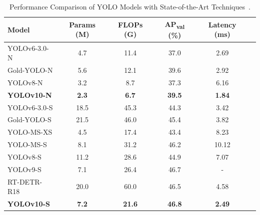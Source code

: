 \documentclass[12pt,oneside]{book} %
\begin{document}
\begin{table}[H]
    \centering
    \caption{Performance Comparison of YOLO Models with State-of-the-Art Techniques~\cite{wang2024yolov10}.}
    \begin{adjustbox}{max width=0.75\textwidth}
        \begin{tabular}{lccccc}
            \toprule
            \textbf{Model}     & \textbf{Params (M)} & \textbf{FLOPs (G)} & \textbf{AP\textsubscript{val} (\%)} & \textbf{Latency (ms)} \\
            \midrule
            YOLOv6-3.0-N       & 4.7                 & 11.4               & 37.0                                & 2.69                  \\
            Gold-YOLO-N        & 5.6                 & 12.1               & 39.6                                & 2.92                  \\
            YOLOv8-N           & 3.2                 & 8.7                & 37.3                                & 6.16                  \\
            \textbf{YOLOv10-N} & \textbf{2.3}        & \textbf{6.7}       & \textbf{39.5}                       & \textbf{1.84}         \\  
            \midrule
            YOLOv6-3.0-S       & 18.5                & 45.3               & 44.3                                & 3.42                  \\  
            Gold-YOLO-S        & 21.5                & 46.0               & 45.4                                & 3.82                  \\  
            YOLO-MS-XS         & 4.5                 & 17.4               & 43.4                                & 8.23                  \\  
            YOLO-MS-S          & 8.1                 & 31.2               & 46.2                                & 10.12                 \\  
            YOLOv8-S           & 11.2                & 28.6               & 44.9                                & 7.07                  \\  
            YOLOv9-S           & 7.1                 & 26.4               & 46.7                                & -                     \\  
            RT-DETR-R18        & 20.0                & 60.0               & 46.5                                & 4.58                  \\  
            \textbf{YOLOv10-S} & \textbf{7.2}        & \textbf{21.6}      & \textbf{46.8}                       & \textbf{2.49}         \\  

\end{tabular}
\end{adjustbox}
\end{table}
\end{document}
